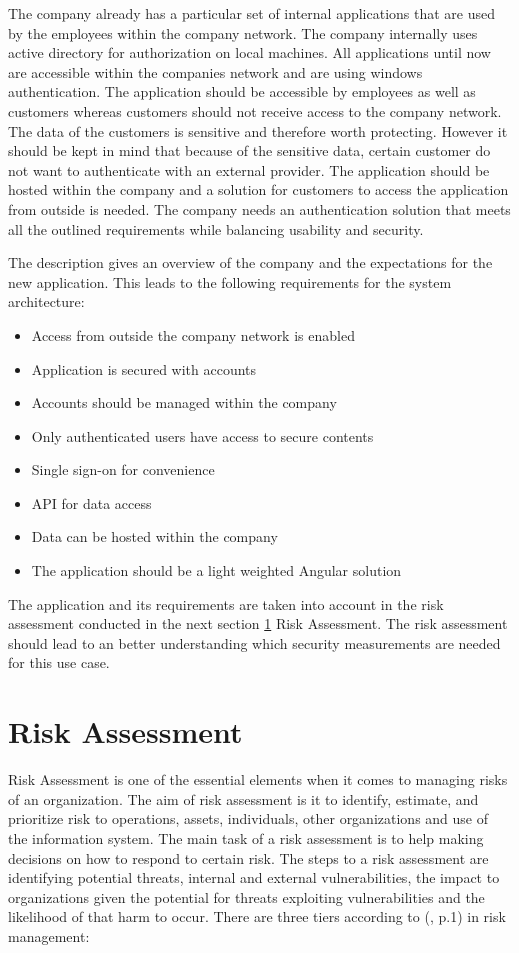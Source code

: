 The company already has a particular set of internal applications that are used by the employees within the company network. The company internally uses active directory for authorization on local machines. All applications until now are accessible within the companies network and are using windows authentication. The application should be accessible by employees as well as customers whereas customers should not receive access to the company network. The data of the customers is sensitive and therefore worth protecting. However it should be kept in mind that because of the sensitive data, certain customer do not want to authenticate with an external provider. The application should be hosted within the company and a solution for customers to access the application from outside is needed. The company needs an authentication solution that meets all the outlined requirements while balancing usability and security. 

The description gives an overview of the company and the expectations for the new application. This leads to the following requirements for the system architecture:

\begin{itemize}
	\item Access from outside the company network is enabled
	\item Application is secured with accounts
	\item Accounts should be managed within the company
	\item Only authenticated users have access to secure contents
	\item Single sign-on for convenience
	\item API for data access
	\item Data can be hosted within the company
	\item The application should be a light weighted Angular solution
\end{itemize} 

The application and its requirements are taken into account in the risk assessment conducted in the next section \ref{riskassessment} Risk Assessment. The risk assessment should lead to an better understanding which security measurements are needed for this use case. 

\section{Risk Assessment}
\label{riskassessment}
Risk Assessment is one of the essential elements when it comes to managing risks of an organization. The aim of risk assessment is it to identify, estimate, and prioritize risk to operations, assets, individuals, other organizations and use of the information system. The main task of a risk assessment is to help making decisions on how to respond to certain risk. The steps to a risk assessment are identifying potential threats, internal and external vulnerabilities, the impact to organizations given the potential for threats exploiting vulnerabilities and the likelihood of that harm to occur. There are three tiers according to (\cite{NIST:2012:GCRA}, p.1) in risk management:

